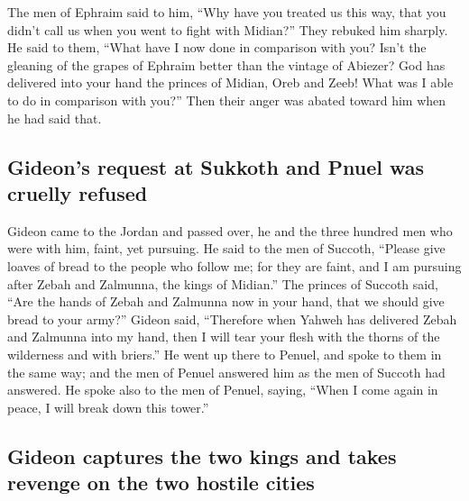  The men of Ephraim said to him, ``Why have you treated us
this way, that you didn't call us when you went to fight with Midian?''
They rebuked him sharply.  He said to them, ``What have I
now done in comparison with you? Isn't the gleaning of the grapes of
Ephraim better than the vintage of Abiezer?  God has
delivered into your hand the princes of Midian, Oreb and Zeeb! What was
I able to do in comparison with you?'' Then their anger was abated
toward him when he had said that.

\hypertarget{gideons-request-at-sukkoth-and-pnuel-was-cruelly-refused}{%
\subsection{Gideon's request at Sukkoth and Pnuel was cruelly
refused}\label{gideons-request-at-sukkoth-and-pnuel-was-cruelly-refused}}

 Gideon came to the Jordan and passed over, he and the
three hundred men who were with him, faint, yet pursuing. 
He said to the men of Succoth, ``Please give loaves of bread to the
people who follow me; for they are faint, and I am pursuing after Zebah
and Zalmunna, the kings of Midian.''  The princes of
Succoth said, ``Are the hands of Zebah and Zalmunna now in your hand,
that we should give bread to your army?''  Gideon said,
``Therefore when Yahweh has delivered Zebah and Zalmunna into my hand,
then I will tear your flesh with the thorns of the wilderness and with
briers.''  He went up there to Penuel, and spoke to them
in the same way; and the men of Penuel answered him as the men of
Succoth had answered.  He spoke also to the men of Penuel,
saying, ``When I come again in peace, I will break down this tower.''

\hypertarget{gideon-captures-the-two-kings-and-takes-revenge-on-the-two-hostile-cities}{%
\subsection{Gideon captures the two kings and takes revenge on the two
hostile
cities}\label{gideon-captures-the-two-kings-and-takes-revenge-on-the-two-hostile-cities}}

